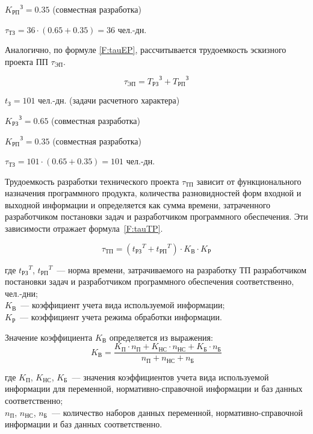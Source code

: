 ${K_{\text{РП}}}^\text{З} = 0.35$ (совместная разработка)

$\tau_{\text{ТЗ}} = 36 \cdot (0.65 + 0.35) = 36 $ чел.-дн.

Аналогично, по формуле \ref{F:tauEP}, рассчитывается трудоемкость эскизного проекта ПП $\tau_{\text{ЭП}}$.

\begin{equation}
\tau_{\text{ЭП}} = {T_{\text{РЗ}}}^\text{З} + {T_{\text{РП}}}^\text{З}
\label{F:tauEP}
\end{equation}

$t_{\text{З}} = 101$ чел.-дн. (задачи расчетного характера)

${K_{\text{РЗ}}}^\text{З} = 0.65$ (совместная разработка)

${K_{\text{РП}}}^\text{З} = 0.35$ (совместная разработка)

$\tau_{\text{ТЗ}} = 101 \cdot (0.65 + 0.35) = 101 $ чел.-дн.

Трудоемкость разработки технического проекта $\tau_{\text{ТП}}$ зависит от функционального назначения программного продукта, количества разновидностей форм входной и выходной информации и определяется как сумма времени, затраченного разработчиком постановки задач  и разработчиком программного обеспечения. Эти зависимости отражает формула~\ref{F:tauTP}.

\begin{equation}
\tau_{\text{ТП}} = ({t_{\text{РЗ}}}^T + {t_{\text{РП}}}^T) \cdot K_{\text{В}} \cdot K_{\text{Р}}
\label{F:tauTP}
\end{equation}

где ${t_{\text{РЗ}}}^T$, ${t_{\text{РП}}}^T$~--- норма времени, затрачиваемого на разработку ТП разработчиком постановки задач и разработчиком программного обеспечения соответственно, чел.-дни; \\ $K_{\text{В}}$~--- коэффициент учета вида используемой информации; \\
$K_{\text{Р}}$~--- коэффициент учета режима обработки информации.

Значение коэффициента $K_{\text{В}}$ определяется из выражения:
\begin{equation}
K_{\text{В}} = \frac{K_{\text{П}} \cdot n_{\text{П}} + K_{\text{НС}} \cdot n_{\text{НС}} + K_{\text{Б}} \cdot n_{\text{Б}}}{n_{\text{П}} + n_{\text{НС}} + n_{\text{Б}}}
\label{F:Kv}
\end{equation}

где $K_{\text{П}}$, $K_{\text{НС}}$, $K_{\text{Б}}$~--– значения коэффициентов учета вида используемой информации для переменной, нормативно-справочной информации и баз данных соответственно; \\ $n_{\text{П}}$, $n_{\text{НС}}$, $n_{\text{Б}}$~--– количество наборов данных переменной, нормативно-справочной информации и баз данных соответственно.


